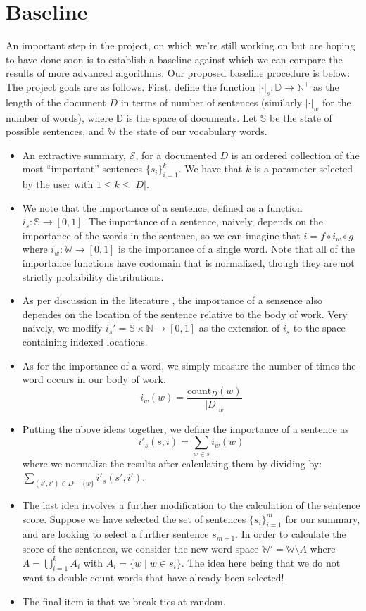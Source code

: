 \documentclass[10pt]{article}
\begin{document}
\section{Baseline}
An important step in the project, on which we're still working on but are hoping to have done soon is to establish a baseline against which we can compare the results of more advanced algorithms. Our proposed baseline procedure is below:
The project goals are as follows. First, define the function $|\cdot|_s : \mathbb{D} \to \mathbb{N}^+$ as the length of the document $D$ in terms of number of sentences (similarly $|\cdot|_w$ for the number of words), where $\mathbb{D}$ is the space of documents. Let $\mathbb{S}$ be the state of possible sentences, and $\mathbb{W}$ the state of our vocabulary words.
\begin{itemize}
\item An extractive summary, $\mathcal{S}$, for a documented $D$ is an ordered collection of the most ``important'' sentences $\{s_i\}_{i=1}^k$. We have that $k$ is a parameter selected by the user with $1 \leq k \leq |D|$.
\item We note that the importance of a sentence, defined as a function $i_s: \mathbb{S} \to [0,1]$. The importance of a sentence, naively, depends on the importance of the words in the sentence, so we can imagine that $i = f \circ i_w \circ g$ where $i_w: \mathbb{W} \to [0,1]$ is the importance of a single word. Note that all of the importance functions have codomain that is normalized, though they are not strictly probability distributions.
\item As per discussion in the literature \cite{sentence_summary} \cite{hmm_summary} \cite{survey}, the importance of a sensence also dependes on the location of the sentence relative to the body of work. Very naively, we modify $i_s' = \mathbb{S} \times \mathbb{N} \to [0,1]$ as the extension of $i_s$ to the space containing indexed locations.
\item As for the importance of a word, we simply measure the number of times the word occurs in our body of work.
$$
i_w(w) = \frac{\text{count}_D(w)}{|D|_w}
$$
\item Putting the above ideas together, we define the importance of a sentence as
$$
i'_s(s,i) = \sum_{w \in s} i_w(w)
$$
where we normalize the results after calculating them by dividing by: $\sum_{(s',i') \in D - \{w\}} i'_s(s',i')$.
\item The last idea involves a further modification to the calculation of the sentence score. Suppose we have selected the set of sentences $\{s_i\}_{i=1}^m$ for our summary, and are looking to select a further sentence $s_{m+1}$. In order to calculate the score of the sentences, we consider the new word space $\mathbb{W'} = \mathbb{W} \setminus A$ where $A = \bigcup_{i=1}^k A_i$ with $A_i = \{w \mid w \in s_i\}$. The idea here being that we do not want to double count words that have already been selected!
\item The final item is that we break ties at random.
\end{itemize}
\end{document}
